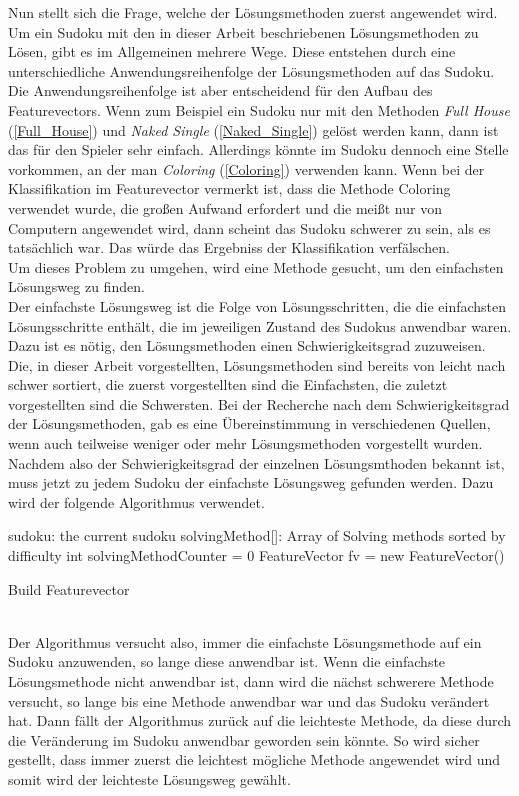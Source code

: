 Nun stellt sich die Frage, welche der Lösungsmethoden zuerst angewendet wird. Um ein Sudoku mit den in dieser Arbeit beschriebenen Lösungsmethoden zu Lösen, gibt es im Allgemeinen mehrere Wege. Diese entstehen durch eine unterschiedliche Anwendungsreihenfolge der Lösungsmethoden auf das Sudoku. Die Anwendungsreihenfolge ist aber entscheidend für den Aufbau des Featurevectors. Wenn zum Beispiel ein Sudoku nur mit den Methoden \textit{Full House} (\ref{Full_House}) und \textit{Naked Single} (\ref{Naked_Single}) gelöst werden kann, dann ist das für den Spieler sehr einfach. Allerdings könnte im Sudoku dennoch eine Stelle vorkommen, an der man \textit{Coloring} (\ref{Coloring}) verwenden kann. Wenn bei der Klassifikation im Featurevector vermerkt ist, dass die Methode Coloring verwendet wurde, die großen Aufwand erfordert und die meißt nur von Computern angewendet wird, dann scheint das Sudoku schwerer zu sein, als es tatsächlich war. Das würde das Ergebniss der Klassifikation verfälschen.\\
Um dieses Problem zu umgehen, wird eine Methode gesucht, um den einfachsten Lösungsweg zu finden.\\
Der einfachste Lösungsweg ist die Folge von Lösungsschritten, die die einfachsten Lösungsschritte enthält, die im jeweiligen Zustand des Sudokus anwendbar waren. Dazu ist es nötig, den Lösungsmethoden einen Schwierigkeitsgrad zuzuweisen. \\
Die, in dieser Arbeit vorgestellten, Lösungsmethoden sind bereits von leicht nach schwer sortiert, die zuerst vorgestellten sind die Einfachsten, die zuletzt vorgestellten sind die Schwersten. Bei der Recherche nach dem Schwierigkeitsgrad der Lösungsmethoden, gab es eine Übereinstimmung in verschiedenen Quellen, wenn auch teilweise weniger oder mehr Lösungsmethoden vorgestellt wurden.\cite{diff1}\cite{diff4}\cite{diff2}\cite{diff3}\\
Nachdem also der Schwierigkeitsgrad der einzelnen Lösungsmthoden bekannt ist, muss jetzt zu jedem Sudoku der einfachste Lösungsweg gefunden werden. Dazu wird der folgende Algorithmus verwendet.\\

\begin{algorithm}[H]
 sudoku: the current sudoku\;
 solvingMethod[]: Array of Solving methods sorted by difficulty\;
 int solvingMethodCounter = 0\;
 FeatureVector fv = new FeatureVector()\;
 \caption{Build Featurevector}
\end{algorithm}
\mbox{} \\
Der Algorithmus versucht also, immer die einfachste Lösungsmethode auf ein Sudoku anzuwenden, so lange diese anwendbar ist. Wenn die einfachste Lösungsmethode nicht anwendbar ist, dann wird die nächst schwerere Methode versucht, so lange bis eine Methode anwendbar war und das Sudoku verändert hat. Dann fällt der Algorithmus zurück auf die leichteste Methode, da diese durch die Veränderung im Sudoku anwendbar geworden sein könnte. So wird sicher gestellt, dass immer zuerst die leichtest mögliche Methode angewendet wird und somit wird der leichteste Lösungsweg gewählt.